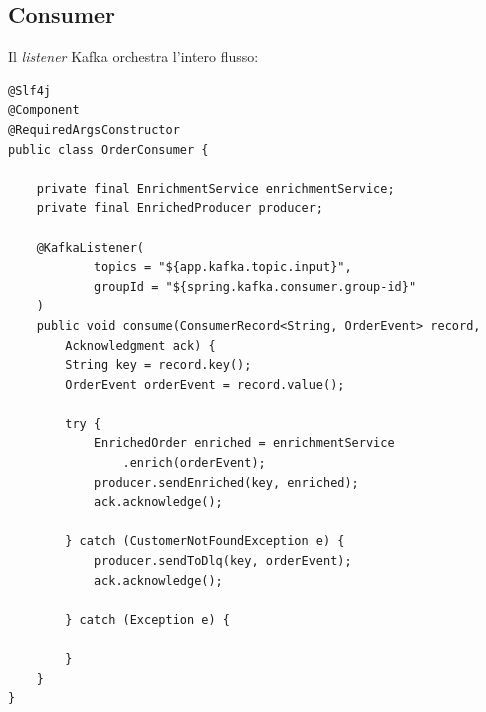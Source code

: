 \subsection{Consumer}
Il \textit{listener} Kafka orchestra l'intero flusso:
\begin{codelisting}[H]
\begin{verbatim}
@Slf4j
@Component
@RequiredArgsConstructor
public class OrderConsumer {

    private final EnrichmentService enrichmentService;
    private final EnrichedProducer producer;

    @KafkaListener(
            topics = "${app.kafka.topic.input}",
            groupId = "${spring.kafka.consumer.group-id}"
    )
    public void consume(ConsumerRecord<String, OrderEvent> record, 
        Acknowledgment ack) {
        String key = record.key();
        OrderEvent orderEvent = record.value();

        try {
            EnrichedOrder enriched = enrichmentService
                .enrich(orderEvent);
            producer.sendEnriched(key, enriched);
            ack.acknowledge();

        } catch (CustomerNotFoundException e) {
            producer.sendToDlq(key, orderEvent);
            ack.acknowledge();

        } catch (Exception e) {
            
        }
    }
}
\end{verbatim}
\caption{OrderConsumer}
\end{codelisting}
